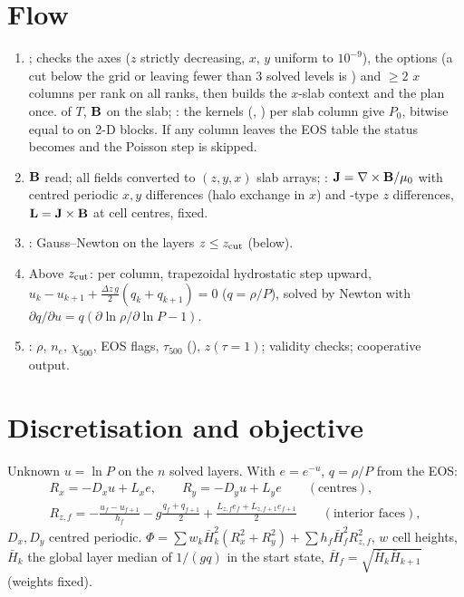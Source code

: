 \section{Flow}
\begin{enumerate}
\item {};  checks the axes ($z$ strictly decreasing, $x$, $y$ uniform to
$10^{-9}$), the options (a cut below the grid or leaving fewer than 3 solved levels is ) and $\ge2$ $x$
columns per rank on all ranks, then builds the $x$-slab context and the  plan once.  of
$T$, $\mathbf B$ on the slab; : the  kernels (, )
per slab column give $P_0$, bitwise equal to  on 2-D blocks. If any column leaves the EOS table the
status becomes  and the Poisson step is skipped.
\item $\mathbf B$ read; all fields converted to $(z,y,x)$ slab arrays; : $\mathbf J=\nabla\times\mathbf B/\mu_0$ with
centred periodic $x,y$ differences (halo exchange in $x$) and -type $z$ differences, $\mathbf L=\mathbf J\times\mathbf B$
at cell centres, fixed.
\item {}: Gauss--Newton on the layers $z\le z_{\rm cut}$ (below).
\item Above $z_{\rm cut}$: per column, trapezoidal hydrostatic step upward, $u_k-u_{k+1}+\tfrac{\Delta z\,g}{2}(q_k+q_{k+1})=0$
($q=\rho/P$), solved by Newton with $\partial q/\partial u=q(\partial\ln\rho/\partial\ln P-1)$.
\item {}: $\rho$, $n_e$, $\chi_{500}$, EOS flags, $\tau_{500}$ (), $z(\tau{=}1)$; validity
checks; cooperative output.
\end{enumerate}

\section{Discretisation and objective}
Unknown $u=\ln P$ on the $n$ solved layers. With $e=e^{-u}$, $q=\rho/P$ from the EOS:
\begin{gather*}
R_x=-D_xu+L_xe,\qquad R_y=-D_yu+L_ye\qquad(\text{centres}),\\
R_{z,f}=-\frac{u_f-u_{f+1}}{h_f}-g\frac{q_f+q_{f+1}}2+\frac{L_{z,f}e_f+L_{z,f+1}e_{f+1}}2\qquad(\text{interior faces}),
\end{gather*}
$D_x,D_y$ centred periodic. $\Phi=\sum w_k\bar H_k^2(R_x^2+R_y^2)+\sum h_f\bar H_f^2R_{z,f}^2$, $w$ cell heights,
$\bar H_k$ the global layer median of $1/(gq)$ in the start state, $\bar H_f=\sqrt{\bar H_k\bar H_{k+1}}$ (weights fixed).

